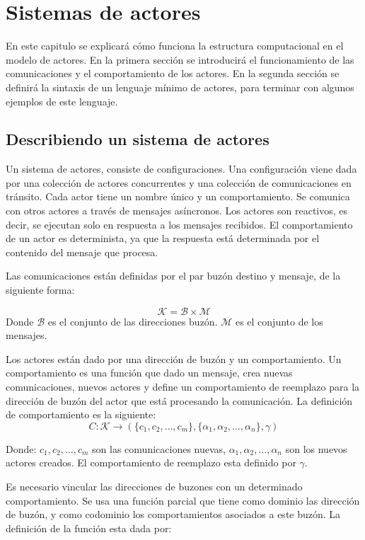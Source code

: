 \chapter{Sistemas de actores}

En este capitulo se explicará cómo funciona la estructura computacional en el modelo de actores. En la primera sección se introducirá el funcionamiento de las comunicaciones y el comportamiento de los actores. En la segunda sección se definirá la sintaxis de un lenguaje mínimo de actores, para terminar con algunos ejemplos de este lenguaje.

\section{Describiendo un sistema de actores}
Un sistema de actores, consiste de configuraciones. Una configuración viene dada por una colección de actores concurrentes y una colección de comunicaciones en tránsito. Cada actor tiene un nombre único y un comportamiento. Se comunica con otros actores a través de mensajes asíncronos. Los actores son reactivos, es decir, se ejecutan solo en respuesta a los mensajes recibidos. El comportamiento de un actor es determinista, ya que la respuesta está determinada por el contenido del mensaje que procesa. 

Las comunicaciones están definidas por el par buzón destino y mensaje, de la siguiente forma:

\[
\mathcal{K} = \mathcal{B} \times \mathcal{M}
\]
Donde $\mathcal{B}$ es el conjunto de las direcciones buzón. $\mathcal{M}$ es el conjunto de los mensajes. 

Los actores están dado por una dirección de buzón y un comportamiento. Un comportamiento es una función que dado un mensaje, crea nuevas comunicaciones, nuevos actores y define un comportamiento de reemplazo para la dirección de buzón del actor que está procesando la comunicación. La definición de comportamiento es la siguiente:
\[
C : \mathcal{K} \rightarrow ( \{ c_1, c_2, \ldots, c_m \}, \{ \alpha_1, \alpha_2, \ldots, \alpha_n \}, \gamma )
\]

Donde: $c_1, c_2, \ldots, c_m$ son las comunicaciones nuevas, $\alpha_1, \alpha_2, \ldots, \alpha_n$ son los nuevos actores creados. El comportamiento de reemplazo esta definido por $\gamma$.

Es necesario vincular las direcciones de buzones con un determinado comportamiento. Se usa una función parcial que tiene como dominio las dirección de buzón, y como codominio los comportamientos asociados a este buzón. La definición de la función esta dada por:

